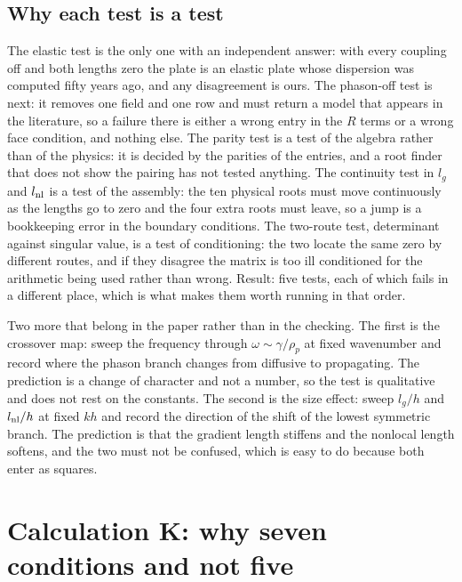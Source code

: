 \documentclass[11pt]{article}
\makeatletter
\newif\ifshowworked
\newenvironment{worked}{%
  \ifshowworked\par\smallskip\noindent\textit{Working.}\par\smallskip\else
  \setbox\z@\vbox\bgroup\fi}{\ifshowworked\par\smallskip\else\egroup\fi}
\makeatother
\begin{document}
\subsection*{Why each test is a test}

\begin{worked}
The elastic test is the only one with an independent answer: with every coupling off and both lengths zero
the plate is an elastic plate whose dispersion was computed fifty years ago, and any disagreement is ours.
The phason-off test is next: it removes one field and one row and must return a model that appears in the
literature, so a failure there is either a wrong entry in the $R$ terms or a wrong face condition, and
nothing else. The parity test is a test of the algebra rather than of the physics: it is decided by the
parities of the entries, and a root finder that does not show the pairing has not tested anything. The
continuity test in $l_g$ and $l_{\rm nl}$ is a test of the assembly: the ten physical roots must move
continuously as the lengths go to zero and the four extra roots must leave, so a jump is a bookkeeping
error in the boundary conditions. The two-route test, determinant against singular value, is a test of
conditioning: the two locate the same zero by different routes, and if they disagree the matrix is too ill
conditioned for the arithmetic being used rather than wrong.
Result: five tests, each of which fails in a different place, which is what makes them worth running in
that order.
\end{worked}

\begin{worked}
Two more that belong in the paper rather than in the checking. The first is the crossover map: sweep the
frequency through $\omega\sim\gamma/\rho_p$ at fixed wavenumber and record where the phason branch changes
from diffusive to propagating. The prediction is a change of character and not a number, so the test is
qualitative and does not rest on the constants. The second is the size effect: sweep $l_g/h$ and $l_{\rm nl}/h$ at fixed $kh$ and
record the direction of the shift of the lowest symmetric branch. The prediction is that the gradient
length stiffens and the nonlocal length softens, and the two must not be confused, which is easy to do
because both enter as squares.
\end{worked}

\section{Calculation K: why seven conditions and not five}
\end{document}
